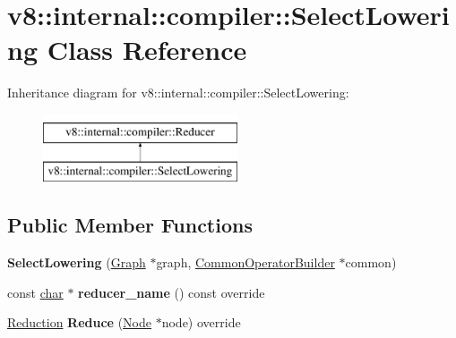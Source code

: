 \hypertarget{classv8_1_1internal_1_1compiler_1_1SelectLowering}{}\section{v8\+:\+:internal\+:\+:compiler\+:\+:Select\+Lowering Class Reference}
\label{classv8_1_1internal_1_1compiler_1_1SelectLowering}
Inheritance diagram for v8\+:\+:internal\+:\+:compiler\+:\+:Select\+Lowering\+:\begin{figure}[H]
\begin{center}
\leavevmode
\includegraphics[height=2.000000cm]{classv8_1_1internal_1_1compiler_1_1SelectLowering}
\end{center}
\end{figure}
\subsection*{Public Member Functions}
\begin{DoxyCompactItemize}
\item 
\mbox{\label{classv8_1_1internal_1_1compiler_1_1SelectLowering_af6aa3aede7f98ac8af20fc9a916c3ec4}} 
{\bfseries Select\+Lowering} (\mbox{\hyperlink{classv8_1_1internal_1_1compiler_1_1Graph}{Graph}} $\ast$graph, \mbox{\hyperlink{classv8_1_1internal_1_1compiler_1_1CommonOperatorBuilder}{Common\+Operator\+Builder}} $\ast$common)
\item 
\mbox{\label{classv8_1_1internal_1_1compiler_1_1SelectLowering_a380a79e29e084ef4c45d62d876c9c18c}} 
const \mbox{\hyperlink{classchar}{char}} $\ast$ {\bfseries reducer\+\_\+name} () const override
\item 
\mbox{\label{classv8_1_1internal_1_1compiler_1_1SelectLowering_a7b7eeb6a4c9766b05a1c13d3cc2ec9d4}} 
\mbox{\hyperlink{classv8_1_1internal_1_1compiler_1_1Reduction}{Reduction}} {\bfseries Reduce} (\mbox{\hyperlink{classv8_1_1internal_1_1compiler_1_1Node}{Node}} $\ast$node) override
\end{DoxyCompactItemize}
